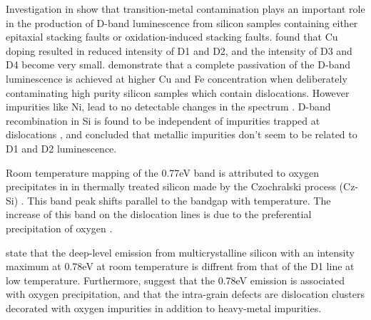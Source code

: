 Investigation in \cite{higgs92} show that transition-metal contamination plays an important role in the production of D-band luminescence from silicon samples containing either epitaxial stacking faults or oxidation-induced stacking faults. \cite{staiger94} found that Cu doping resulted in reduced intensity of D1 and D2, and the intensity of D3 and D4 become very small. \cite{weronek91} demonstrate that a complete passivation of the D-band luminescence is achieved at higher Cu and Fe concentration when deliberately contaminating high purity silicon samples which contain dislocations. However impurities like Ni, lead to no detectable changes in the spectrum \cite{weronek91}. D-band recombination in Si is found to be independent of impurities trapped at dislocations \cite{weronek91}, and \cite{sekiguchi95} concluded that metallic impurities don't seem to be related to D1 and D2 luminescence. %

Room temperature mapping of the 0.77eV band is attributed to oxygen precipitates in in thermally treated silicon made by the Czochralski process (Cz-Si) \cite{tajima95}. This band peak shifts parallel to the bandgap with temperature. The increase of this band on the dislocation lines is due to the preferential precipitation of oxygen \cite{tajima95}.

\cite{inoue07} state that the deep-level emission from multicrystalline silicon with an intensity maximum at 0.78eV at room temperature is diffrent from that of the D1 line at low temperature. Furthermore, \cite{inoue07} suggest that the 0.78eV emission is associated with oxygen precipitation, and that the intra-grain defects are dislocation clusters decorated with oxygen impurities in addition to heavy-metal impurities.